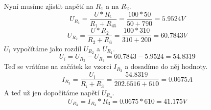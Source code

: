 Nyní musíme zjistit napětí na $R_1$ a na $R_2$.
$$U_{R_1}=\frac{U*R_1}{R_1+R_{45}}=\frac{100*50}{50+790}=5.9524V$$
$$U_{R_2}=\frac{U*R_2}{R_2+R_6}=\frac{100*310}{310+200}=60.7843V$$
$U_i$ vypočítáme jako rozdíl $U_{R_2}$ a $U_{R_1}$.
$$U_i=U_{R_2}-U_{R_1}=60.7843-5.9524=54.8319$$
Teď se vrátíme na začátek ke vzorci $I_{R_3}$ a dosadíme do něj hodnoty.
$$I_{R_3}=\frac{U_i}{R_i+R_3}=\frac{54.8319}{202.6516+610}=0.0675A$$
A teď už jen dopočítáme napětí $U_{R_3}$.
$$U_{R_3}=I_{R_3}*R_3=0.0675*610=41.175V$$

